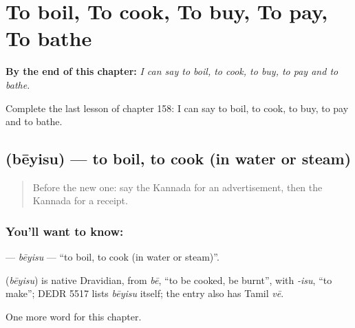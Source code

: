 
\chapter{To boil, To cook, To buy, To pay, To bathe}
\label{ch:ka-to-boil-to-cook-to-buy-to-pay-to-bathe}

\begin{chapteropening}
\textbf{By the end of this chapter:} \emph{I can say to boil, to cook, to buy, to pay and to bathe.}

Complete the last lesson of chapter 158: I can say to boil, to cook, to buy, to pay and to bathe.
\end{chapteropening}

\section[\texorpdfstring{\kn{ಬೇಯಿಸು} (bēyisu)}{ಬೇಯಿಸು (bēyisu)}]{ (bēyisu) — to boil, to cook (in water or steam)}

\label{lesson:KA-C158-beyisu}



\begin{quote}
Before the new one: say the Kannada for an advertisement, then the Kannada for a receipt.
\end{quote}

\subsection*{You'll want to know: }
\textbf{} — \emph{bēyisu} — \textquotedblleft{}to boil, to cook (in water or steam)\textquotedblright{}.

\begin{cousinweb}
\textbf{} (\emph{bēyisu}) is native Dravidian, from \emph{bē}, \textquotedblleft{}to be cooked, be burnt\textquotedblright{}, with \emph{-isu}, \textquotedblleft{}to make\textquotedblright{}; DEDR 5517 lists \emph{bēyisu} itself; the entry also has Tamil \emph{vē}.
\end{cousinweb}

\begin{grammarlens}[title={What you've built}]
One more word for this chapter.
\end{grammarlens}

